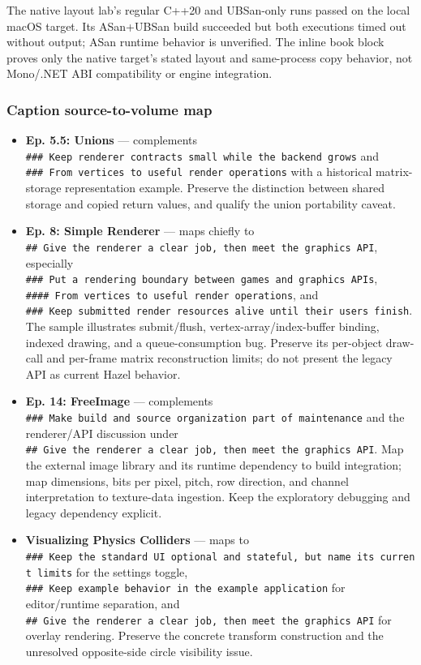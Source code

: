 The native layout lab's regular C++20 and UBSan-only runs passed on the local macOS target. Its ASan+UBSan build succeeded but both executions timed out without output; ASan runtime behavior is unverified. The inline book block proves only the native target's stated layout and same-process copy behavior, not Mono/.NET ABI compatibility or engine integration.

\subsubsection{Caption source-to-volume map}\label{caption-source-to-volume-map}

\begin{itemize}
\tightlist
\item
  \textbf{Ep. 5.5: Unions} --- complements \texttt{\#\#\#\ Keep\ renderer\ contracts\ small\ while\ the\ backend\ grows} and \texttt{\#\#\#\ From\ vertices\ to\ useful\ render\ operations} with a historical matrix-storage representation example. Preserve the distinction between shared storage and copied return values, and qualify the union portability caveat.
\item
  \textbf{Ep. 8: Simple Renderer} --- maps chiefly to \texttt{\#\#\ Give\ the\ renderer\ a\ clear\ job,\ then\ meet\ the\ graphics\ API}, especially \texttt{\#\#\#\ Put\ a\ rendering\ boundary\ between\ games\ and\ graphics\ APIs}, \texttt{\#\#\#\#\ From\ vertices\ to\ useful\ render\ operations}, and \texttt{\#\#\#\ Keep\ submitted\ render\ resources\ alive\ until\ their\ users\ finish}. The sample illustrates submit/flush, vertex-array/index-buffer binding, indexed drawing, and a queue-consumption bug. Preserve its per-object draw-call and per-frame matrix reconstruction limits; do not present the legacy API as current Hazel behavior.
\item
  \textbf{Ep. 14: FreeImage} --- complements \texttt{\#\#\#\ Make\ build\ and\ source\ organization\ part\ of\ maintenance} and the renderer/API discussion under \texttt{\#\#\ Give\ the\ renderer\ a\ clear\ job,\ then\ meet\ the\ graphics\ API}. Map the external image library and its runtime dependency to build integration; map dimensions, bits per pixel, pitch, row direction, and channel interpretation to texture-data ingestion. Keep the exploratory debugging and legacy dependency explicit.
\item
  \textbf{Visualizing Physics Colliders} --- maps to \texttt{\#\#\#\ Keep\ the\ standard\ UI\ optional\ and\ stateful,\ but\ name\ its\ current\ limits} for the settings toggle, \texttt{\#\#\#\ Keep\ example\ behavior\ in\ the\ example\ application} for editor/runtime separation, and \texttt{\#\#\ Give\ the\ renderer\ a\ clear\ job,\ then\ meet\ the\ graphics\ API} for overlay rendering. Preserve the concrete transform construction and the unresolved opposite-side circle visibility issue.

\end{itemize}
